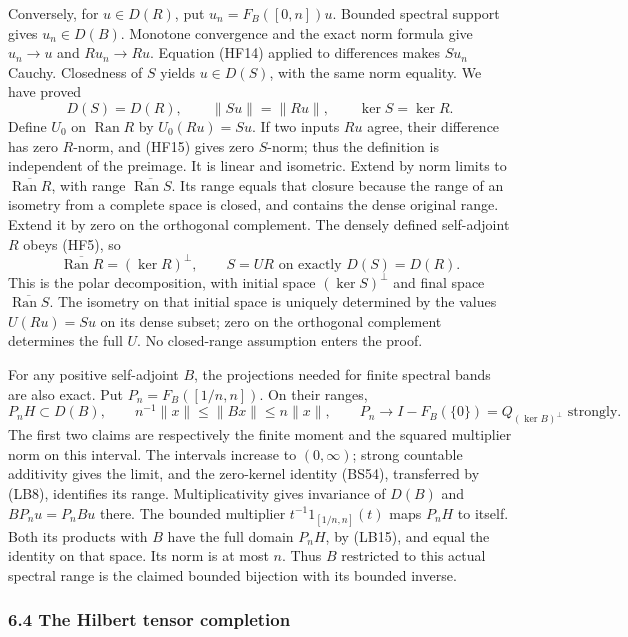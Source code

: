 \documentclass[
  11pt,
]{article}
\begin{document}
Conversely, for \(u\in D(R)\), put \(u_n=F_B([0,n])u\). Bounded spectral
support gives \(u_n\in D(B)\). Monotone convergence and the exact norm
formula give \(u_n\to u\) and \(Ru_n\to Ru\). Equation (HF14) applied to
differences makes \(Su_n\) Cauchy. Closedness of \(S\) yields
\(u\in D(S)\), with the same norm equality. We have proved \[
 D(S)=D(R),\qquad \|Su\|=\|Ru\|,\qquad
 \ker S=\ker R.
 \tag{HF15}
\] Define \(U_0\) on \(\operatorname{Ran}R\) by \(U_0(Ru)=Su\). If two
inputs \(Ru\) agree, their difference has zero \(R\)-norm, and (HF15)
gives zero \(S\)-norm; thus the definition is independent of the
preimage. It is linear and isometric. Extend by norm limits to
\(\overline{\operatorname{Ran}R}\), with range
\(\overline{\operatorname{Ran}S}\). Its range equals that closure
because the range of an isometry from a complete space is closed, and
contains the dense original range. Extend it by zero on the orthogonal
complement. The densely defined self-adjoint \(R\) obeys (HF5), so \[
 \overline{\operatorname{Ran}R}=(\ker R)^\perp,\qquad
 S=UR\text{ on exactly }D(S)=D(R).
 \tag{HF16}
\] This is the polar decomposition, with initial space
\((\ker S)^\perp\) and final space \(\overline{\operatorname{Ran}S}\).
The isometry on that initial space is uniquely determined by the values
\(U(Ru)=Su\) on its dense subset; zero on the orthogonal complement
determines the full \(U\). No closed-range assumption enters the proof.

For any positive self-adjoint \(B\), the projections needed for finite
spectral bands are also exact. Put \(P_n=F_B([1/n,n])\). On their
ranges, \[
 P_nH\subset D(B),\qquad
 n^{-1}\|x\|\leq\|Bx\|\leq n\|x\|,\qquad
 P_n\longrightarrow I-F_B(\{0\})=Q_{(\ker B)^\perp}
 \text{ strongly}.
 \tag{HF17}
\] The first two claims are respectively the finite moment and the
squared multiplier norm on this interval. The intervals increase to
\((0,\infty)\); strong countable additivity gives the limit, and the
zero-kernel identity (BS54), transferred by (LB8), identifies its range.
Multiplicativity gives invariance of \(D(B)\) and \(BP_nu=P_nBu\) there.
The bounded multiplier \(t^{-1}1_{[1/n,n]}(t)\) maps \(P_nH\) to itself.
Both its products with \(B\) have the full domain \(P_nH\), by (LB15),
and equal the identity on that space. Its norm is at most \(n\). Thus
\(B\) restricted to this actual spectral range is the claimed bounded
bijection with its bounded inverse.

\subsubsection{6.4 The Hilbert tensor
completion}\label{the-hilbert-tensor-completion}
\end{document}
